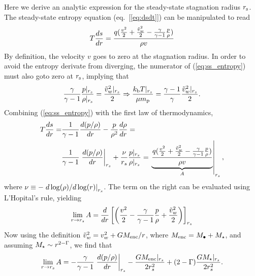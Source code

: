 
Here we derive an analytic expression for the steady-state stagnation radius $r_{\rm s}$.  The steady-state entropy equation (eq.~[\ref{eq:dsdt}]) can be manipulated to read
\begin{align}
T\frac{d s}{d r}=\frac{q (\frac{v^2}{2}+\frac{\tilde{v}_{w}^2}{2}-\frac{\gamma}{\gamma-1} \frac{p}{\rho})}{\rho v} \label{eq:ss_entropy}
\end{align}
By definition, the velocity $v$ goes to zero at the stagnation radius.  In order to avoid the entropy derivate from diverging, the numerator of (\ref{eq:ss_entropy}) must also goto zero at $r_{\rm s}$, implying that
\begin{align}
 \frac{\gamma}{\gamma-1} \frac{p|_{r_s}}{\rho|_{r_s}}=\frac{\tilde{v}_{w}^{2}|_{r_s}}{2} \Rightarrow \frac{k_{\rm b} T|_{r_s}}{\mu m_{\rm p}}=\frac{\gamma-1}{\gamma} \frac{\tilde{v}_{w}^{2}|_{r_s}}{2} .
\label{eq:appTanalytic}
\end{align}
Combining (\ref{eq:ss_entropy}) with the first law of thermodynamics,
\begin{align}
T\frac{d s}{d r} =& \frac{1}{\gamma-1}\frac{d (p/\rho)}{d r}-\frac{p}{\rho^2}\frac{d \rho}{d r} = \\
& 
\frac{1}{\gamma-1}\left.\frac{d (p/\rho)}{d r}\right|_{r_s}+\frac{\nu}{r_s}  \frac{p|_{r_s}}{\rho|_{r_s}}=\left.\underbrace{\frac{q (\frac{v^2}{2}+\frac{\tilde{v}_{w}^2}{2}-\frac{\gamma}{\gamma-1} \frac{p}{\rho})}{\rho  v}}_{A}\right|_{r_s}, 
 \label{eq:first_law}
\end{align}
where $\nu\equiv -\left.d\log(\rho)/d\log(r)\right|_{r_s}$.  The term on the right can be evaluated using L'Hopital's rule, yielding
\begin{align}
  \lim_{r \rightarrow r_s} A = \frac{d}{dr} \left[\left(\frac{v^2}{2} -\frac{\gamma}{\gamma-1} \frac{p}{\rho}+\frac{\tilde{v}_{w}^2}{2}\right)\right]_{r_s}
\end{align}
Now using the definition $\tilde{v}_{w}^2=v_{w}^2+ G M_{\rm enc}/r$, where
$M_{\rm enc}=M_{\bullet}+M_{\star}$, and assuming $M_{\star} \sim r^{2-\Gamma}$, we find that
\begin{align}
\lim_{r \rightarrow r_s} A=-\frac{\gamma}{\gamma-1}
\left.\frac{d (p/\rho)}{d r}\right|_{r_s}-\frac{G M_{\rm enc}|_{r_s}}{2 r_s^2}+(2-\Gamma) \frac{G
  M_{\star}|_{r_s}}{2 r_s^2}.
\end{align}
